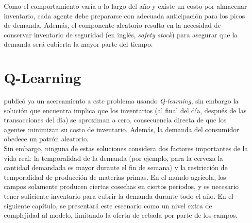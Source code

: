 Como el comportamiento var\'ia a lo largo del a\~no y existe un costo por almacenar inventario, cada agente debe prepararse con adecuada anticipaci\'on para los picos de demanda. Adem\'as, el componente aleatorio resulta en la necesidad de conservar inventario de seguridad (en ingl\'es, \textit{safety stock}) para asegurar que la demanda ser\'a cubierta la mayor parte del tiempo.

\section{Q-Learning}

\citet{Chaharsooghi} public\'o ya un acercamiento a este problema usando \textit{Q-learning}, sin embargo la soluci\'on que encuentra implica que los inventarios (al final del d\'ia, despu\'es de las transacciones del d\'ia) se aproximan a cero, consecuencia directa de que los agentes minimizan su costo de inventario. Adem\'as, la demanda del consumidor obedece un patr\'on aleatorio.\\

Sin embargo, ninguna de estas soluciones considera dos factores importantes de la vida real: la temporalidad de la demanda (por ejemplo, para la cerveza la cantidad demandada es mayor durante el fin de semana) y la restricción de temporalidad de producci\'on de materias primas. En el mundo agr\'icola, los campos solamente producen ciertas cosechas en ciertos periodos, y es necesario tener suficiente inventario para cubrir la demanda durante todo el a\~no. En el siguiente cap\'itulo, se presentar\'a este escenario como un nivel extra de complejidad al modelo, limitando la oferta de cebada por parte de los campos.